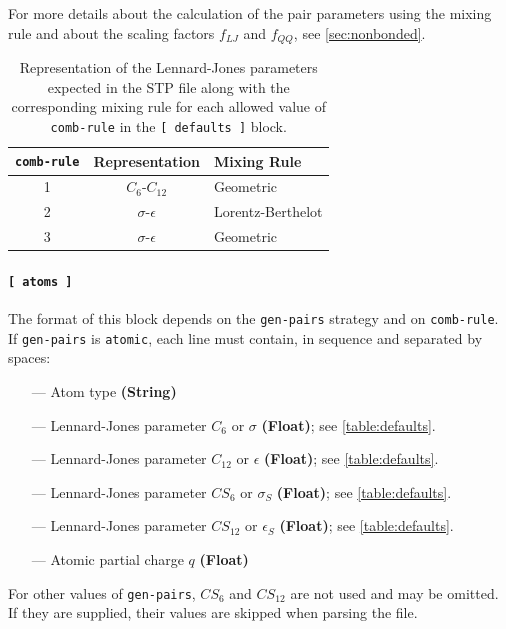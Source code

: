 \documentclass[10pt,a4paper,openany]{memoir}
\numberwithin{equation}{section}
\begin{document}
For more details about the calculation of the pair parameters using the mixing rule and about the scaling factors $f_{LJ}$ and $f_{QQ}$, see \autoref{sec:nonbonded}.

\begin{table}[tb]
  \caption{Representation of the Lennard-Jones parameters expected in
    the STP file along with the corresponding mixing rule for each
    allowed value of \texttt{comb-rule} in the \texttt{[~defaults~]}
    block.}
  \label{table:defaults}
  \hspace{1ex}\par
  \centering
  \begin{tabular}{ccl}
    \toprule
    \texttt{comb-rule} & Representation & Mixing Rule \\ \midrule
    1 & $C_6$-$C_{12}$ & Geometric \\
    2 & $\sigma$-$\epsilon$ & Lorentz-Berthelot \\
    3 & $\sigma$-$\epsilon$ & Geometric \\
    \bottomrule
  \end{tabular}
\end{table}

\paragraph{\texttt{[~atoms~]}}

The format of this block depends on the \texttt{gen-pairs} strategy and on \texttt{comb-rule}.
If \texttt{gen-pairs} is \texttt{atomic}, each line must contain, in sequence and separated by spaces:
\begin{itemize}
\item[---] Atom type \textbf{(String)}
\item[---] Lennard-Jones parameter $C_6$ or $\sigma$ \textbf{(Float)}; see \autoref{table:defaults}.
\item[---] Lennard-Jones parameter $C_{12}$ or $\epsilon$ \textbf{(Float)}; see \autoref{table:defaults}.
\item[---] Lennard-Jones parameter $CS_6$ or $\sigma_S$ \textbf{(Float)}; see \autoref{table:defaults}.
\item[---] Lennard-Jones parameter $CS_{12}$ or $\epsilon_S$ \textbf{(Float)}; see \autoref{table:defaults}.
\item[---] Atomic partial charge $q$ \textbf{(Float)}
\end{itemize}
For other values of \texttt{gen-pairs}, $CS_6$ and $CS_{12}$ are not used and may be omitted.
If they are supplied, their values are skipped when parsing the file.
\end{document}
